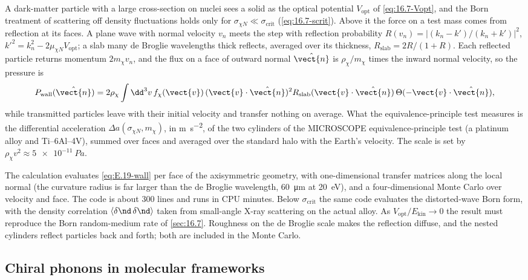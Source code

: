 A dark-matter particle with a large cross-section on nuclei sees a solid as the optical potential $V_{\mathrm{opt}}$ of \cref{eq:16.7-Vopt}, and the Born treatment of scattering off density fluctuations holds only for $\sigma_{\chi N} \ll \sigma_{\mathrm{crit}}$ (\cref{eq:16.7-scrit}). Above it the force on a test mass comes from reflection at its faces. A plane wave with normal velocity $v_n$ meets the step with reflection probability $R(v_n) = |(k_n - k')/(k_n + k')|^2$, $k'^2 = k_n^2 - 2\mu_{\chi N}V_{\mathrm{opt}}$; a slab many de Broglie wavelengths thick reflects, averaged over its thickness, $R_{\mathrm{slab}} = 2R/(1 + R)$. Each reflected particle returns momentum $2m_\chi v_n$, and the flux on a face of outward normal $\hat{\vect{n}}$ is $\rho_\chi/m_\chi$ times the inward normal velocity, so the pressure is
\begin{equation}
  P_{\mathrm{wall}}(\hat{\vect{n}}) = 2\rho_\chi\int\dd^3v\,f_\chi(\vect{v})\,(\vect{v}\cdot\hat{\vect{n}})^2R_{\mathrm{slab}}(\vect{v}\cdot\hat{\vect{n}})\,\Theta(-\vect{v}\cdot\hat{\vect{n}}) ,
  \label{eq:E.19-wall}
\end{equation}
while transmitted particles leave with their initial velocity and transfer nothing on average. What the equivalence-principle test measures is the differential acceleration $\Delta a(\sigma_{\chi N},m_\chi)$, in \si{m.s^{-2}}, of the two cylinders of the MICROSCOPE equivalence-principle test (a platinum alloy and Ti--6Al--4V), summed over faces and averaged over the standard halo with the Earth's velocity. The scale is set by $\rho_\chi v^2 \approx \SI{5e-11}{Pa}$.

The calculation evaluates \cref{eq:E.19-wall} per face of the axisymmetric geometry, with one-dimensional transfer matrices along the local normal (the curvature radius is far larger than the de Broglie wavelength, \SI{60}{\micro m} at \SI{20}{eV}), and a four-dimensional Monte Carlo over velocity and face. The code is about 300 lines and runs in CPU minutes. Below $\sigma_{\mathrm{crit}}$ the same code evaluates the distorted-wave Born form, with the density correlation $\langle\delta\nd\,\delta\nd\rangle$ taken from small-angle X-ray scattering on the actual alloy. As $V_{\mathrm{opt}}/E_{\mathrm{kin}} \to 0$ the result must reproduce the Born random-medium rate of \cref{sec:16.7}. Roughness on the de Broglie scale makes the reflection diffuse, and the nested cylinders reflect particles back and forth; both are included in the Monte Carlo.

\subsection{Chiral phonons in molecular frameworks}

